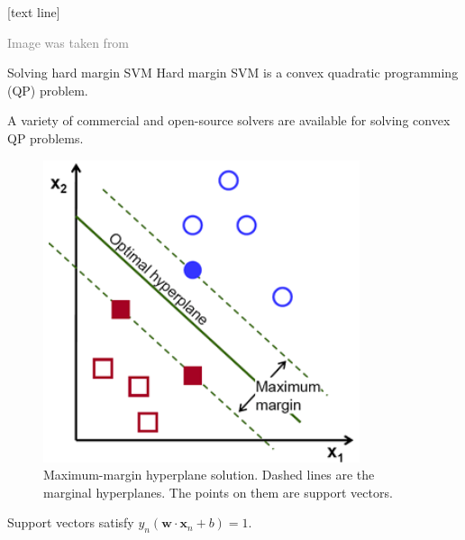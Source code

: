 \documentclass[dvipsnames]{beamer}
\newcommand{\referencefootnote}[1]{\setbeamertemplate{footline}[text line]{%
\parbox{0.9\paperwidth}{\vspace*{-23pt}\tiny{\textcolor{gray}{#1}}\hfill\scriptsize\insertframenumber}}}
\begin{document}
		{ \referencefootnote{Image was taken from \cite{LakshmanNaika2019HandwrittenEC}}
		\begin{frame}{Solving hard margin SVM}
			Hard margin SVM is a convex quadratic programming (QP) problem. %
			
			A variety of commercial and open-source solvers are available for solving convex QP problems. %
				\begin{figure}
					\center
					\includegraphics[scale=.32]{figures/margin5.png}
           \caption{Maximum-margin hyperplane solution. Dashed lines are the marginal hyperplanes. The points on them are support vectors.}
        \end{figure}
				
				Support vectors satisfy $y_n(\mathbf{w}\cdot\mathbf{x}_n + b)=1$.
			
    \end{frame}
		}
		
\end{document}
